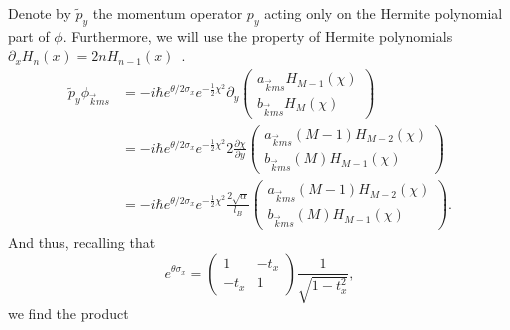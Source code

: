 Denote by \(\tilde{p}_{y}\) the momentum operator \(p_{y}\) acting only on the Hermite polynomial part of \(\phi \).
Furthermore, we will use the property of Hermite polynomials \(\partial _{x} H_{n} (x) = 2 n H_{n-1} (x)\)~\cite[Eq.~18.9.25]{NIST:DLMF}.
\begin{align}
  \tilde{p}_{y} \phi _{\vec{k} ms} &=
  -i \hbar
  e^{\theta /2 \sigma _{x}}
  e^{-\frac{1}{2} \chi ^2}
  \partial _{y}
  \begin{pmatrix}
    a_{\vec{k} m s} H_{M-1} (\chi) \\
    b_{\vec{k} ms} H_{M} (\chi)
  \end{pmatrix}\\
                                   &=
                                     -i \hbar
                                     e^{\theta /2 \sigma _{x}}
                                     e^{-\frac{1}{2} \chi ^2}
                                     2 \frac{\partial \chi }{\partial y}
                                     \begin{pmatrix}
                                       a_{\vec{k} m s} (M-1) H_{M-2} (\chi) \\
                                       b_{\vec{k} ms} (M) H_{M-1} (\chi)
                                     \end{pmatrix}\\
                                   &=
                                     -i \hbar
                                     e^{\theta /2 \sigma _{x}}
                                     e^{-\frac{1}{2} \chi ^2}
                                     \frac{2 \sqrt{\alpha}}{ l_{B} }
                                     \begin{pmatrix}
                                       a_{\vec{k} m s} (M-1) H_{M-2} (\chi) \\
                                       b_{\vec{k} ms} (M) H_{M-1} (\chi)
                                     \end{pmatrix}.
\end{align}
And thus, recalling that
\[
  e^{\theta \sigma _{x}} =
  \begin{pmatrix}
    1 & -t_{x}\\
    -t_{x} & 1
  \end{pmatrix}
  \frac{1}{\sqrt{1-t_{x}^2}},
\]
we find the product
